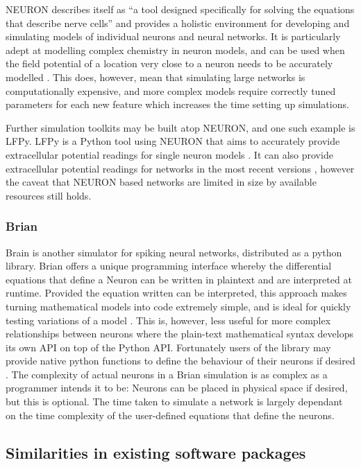 NEURON describes itself as ``a tool designed specifically for solving the
equations that describe nerve cells'' and provides a holistic environment for
developing and simulating models of individual neurons and neural networks. It
is particularly adept at modelling complex chemistry in neuron models, and can
be used when the field potential of a location very close to a neuron needs to
be accurately modelled \autocite{carnevale_neuron_2006}. This does, however,
mean that simulating large networks is computationally expensive, and more
complex models require correctly tuned parameters for each new feature which
increases the time setting up simulations.

Further simulation toolkits may be built atop NEURON, and one such example is
LFPy. LFPy is a Python tool using NEURON that aims to accurately provide
extracellular potential readings for single neuron models
\autocite{hagen_hybrid_2016}. It can also provide extracellular potential
readings for networks in the most recent versions \autocite{hagen_lfpy_2019},
however the caveat that NEURON based networks are limited in size by available
resources still holds.

\subsubsection{Brian}

Brain is another simulator for spiking neural networks, distributed as a python
library. Brian offers a unique programming interface whereby the differential
equations that define a Neuron can be written in plaintext and are interpreted
at runtime. Provided the equation written can be interpreted, this approach
makes turning mathematical models into code extremely simple, and is ideal for
quickly testing variations of a model \autocite{stimberg_brian_2019}. This is,
however, less useful for more complex relationships between neurons where the
plain-text mathematical syntax develops its own API on top of the Python API.
Fortunately users of the library may provide native python functions to define
the behaviour of their neurons if desired \autocite{noauthor_functions_2020}.
The complexity of actual neurons in a Brian simulation is as complex as a
programmer intends it to be: Neurons can be placed in physical space if desired,
but this is optional. The time taken to simulate a network is largely dependant
on the time complexity of the user-defined equations that define the neurons.

\subsection{Similarities in existing software packages}


